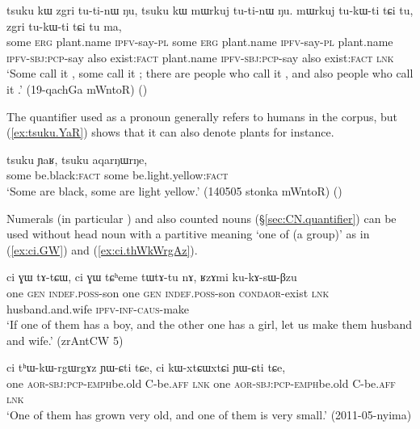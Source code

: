 \begin{exe}
\ex \label{ex:zgri.mWrkuj}
\gll tsuku kɯ zgri tu-ti-nɯ ŋu, tsuku kɯ mɯrkuj tu-ti-nɯ ŋu. mɯrkuj tu-kɯ-ti tɕi tu, zgri tu-kɯ-ti tɕi tu ma, \\
some \textsc{erg} plant.name \textsc{ipfv}-say-\textsc{pl} some \textsc{erg} plant.name \textsc{ipfv}-say-\textsc{pl} plant.name  \textsc{ipfv}-\textsc{sbj}:\textsc{pcp}-say also exist:\textsc{fact} plant.name  \textsc{ipfv}-\textsc{sbj}:\textsc{pcp}-say also exist:\textsc{fact}  \textsc{lnk} \\
\glt  `Some call it , some call it ; there are people who call it , and also people who call it .' (19-qachGa mWntoR)
()
\end{exe}
 
The quantifier  used as a pronoun generally refers to humans in the corpus, but (\ref{ex:tsuku.YaR}) shows that it can also denote plants for instance. 

\begin{exe}
\ex \label{ex:tsuku.YaR}
\gll tsuku ɲaʁ, tsuku aqarŋɯrŋe, \\
some be.black:\textsc{fact} some be.light.yellow:\textsc{fact} \\
\glt `Some are black, some are light yellow.' (140505 stonka mWntoR) ()
\end{exe}

Numerals (in particular ) and also counted nouns (§\ref{sec:CN.quantifier}) can be used without head noun with a partitive meaning `one of (a group)' as in (\ref{ex:ci.GW})  and (\ref{ex:ci.thWkWrgAz}).

\begin{exe}
\ex \label{ex:ci.GW}
\gll ci ɣɯ 	tɤ-tɕɯ,  ci ɣɯ tɕʰeme tɯ\redp{}tɤ-tu nɤ, ʁzɤmi ku-kɤ-sɯ-βzu \\
one \textsc{gen} \textsc{indef}.\textsc{poss}-son one \textsc{gen} \textsc{indef}.\textsc{poss}-son \textsc{cond}\redp{}\textsc{aor}-exist \textsc{lnk} husband.and.wife \textsc{ipfv}-\textsc{inf}-\textsc{caus}-make \\
\glt `If one of them has a boy, and the other one has a girl, let us make them husband and wife.' (zrAntCW 5)
\end{exe}

\begin{exe}
\ex \label{ex:ci.thWkWrgAz}
\gll ci tʰɯ-kɯ-rgɯ\redp{}rgɤz ɲɯ-ɕti tɕe, ci kɯ-xtɕɯ\redp{}xtɕi ɲɯ-ɕti tɕe, \\
one \textsc{aor}-\textsc{sbj}:\textsc{pcp}-\textsc{emph}\redp{}be.old C-be.\textsc{aff} \textsc{lnk} one \textsc{aor}-\textsc{sbj}:\textsc{pcp}-\textsc{emph}\redp{}be.old C-be.\textsc{aff} \textsc{lnk}  \\
\glt `One of them has grown very old, and one of them is very small.' (2011-05-nyima)
\end{exe}

